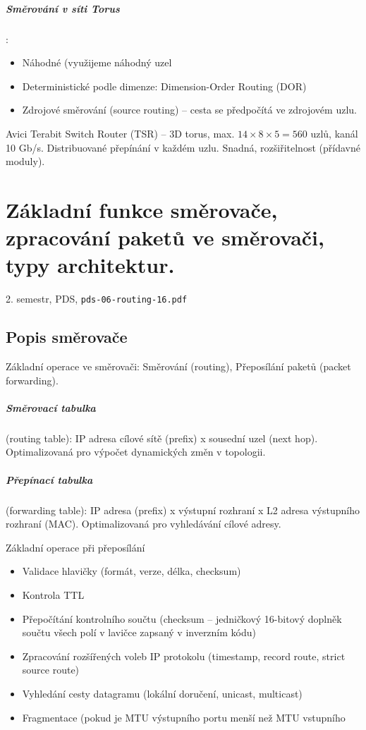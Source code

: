 \documentclass[a4paper, 11pt]{report}
\begin{document}
\paragraph{Směrování v síti Torus}:
\begin{itemize}
	\item Náhodné (využijeme náhodný uzel
	\item Deterministické podle dimenze: Dimension-Order Routing (DOR)
	\item Zdrojové směrování (source routing) -- cesta se předpočítá ve zdrojovém uzlu.
\end{itemize}

Avici Terabit Switch Router (TSR) -- 3D torus, max. $14 \times 8 \times 5 = 560$ uzlů, kanál 10 Gb/s. Distribuované přepínání v každém uzlu. Snadná, rozšiřitelnost (přídavné moduly).

\chapter{Základní funkce směrovače, zpracování paketů ve směrovači, typy architektur.} \label{cha:40}
2. semestr, PDS, \texttt{pds-06-routing-16.pdf}

\section{Popis směrovače}
Základní operace ve směrovači: Směrování (routing), Přeposílání paketů (packet forwarding).

\paragraph{Směrovací tabulka} (routing table): IP adresa cílové sítě (prefix) x sousední uzel (next hop). Optimalizovaná pro výpočet dynamických změn v topologii.

\paragraph{Přepínací tabulka} (forwarding table): IP adresa (prefix) x výstupní rozhraní x L2 adresa výstupního rozhraní (MAC). Optimalizovaná pro vyhledávání cílové adresy.

Základní operace při přeposílání
\begin{itemize}
	\item Validace hlavičky (formát, verze, délka, checksum)
	\item Kontrola TTL
	\item Přepočítání kontrolního součtu (checksum -- jedničkový 16-bitový doplněk součtu všech polí v lavičce zapsaný v inverzním kódu)
	\item Zpracování rozšířených voleb IP protokolu (timestamp, record route, strict source route)
	\item Vyhledání cesty datagramu (lokální doručení, unicast, multicast)
	\item Fragmentace (pokud je MTU výstupního portu menší než MTU vstupního
\end{itemize}
\end{document}
